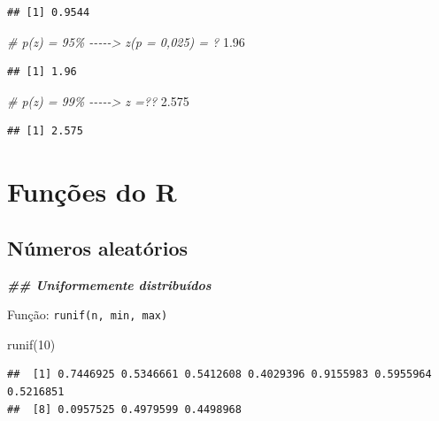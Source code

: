 \documentclass[
]{article}
\newenvironment{Shaded}{\begin{snugshade}}{\end{snugshade}}
\newcommand{\CommentTok}[1]{\textcolor[rgb]{0.56,0.35,0.01}{\textit{#1}}}
\newcommand{\DecValTok}[1]{\textcolor[rgb]{0.00,0.00,0.81}{#1}}
\newcommand{\DocumentationTok}[1]{\textcolor[rgb]{0.56,0.35,0.01}{\textbf{\textit{#1}}}}
\newcommand{\FloatTok}[1]{\textcolor[rgb]{0.00,0.00,0.81}{#1}}
\newcommand{\FunctionTok}[1]{\textcolor[rgb]{0.00,0.00,0.00}{#1}}
\newcommand{\NormalTok}[1]{#1}
\begin{document}
\begin{verbatim}
## [1] 0.9544
\end{verbatim}

\begin{Shaded}
\begin{Highlighting}[]
\CommentTok{\# p(z) = 95\% {-}{-}{-}{-}{-}\textgreater{} z(p = 0,025) = ?}
\FloatTok{1.96}
\end{Highlighting}
\end{Shaded}

\begin{verbatim}
## [1] 1.96
\end{verbatim}

\begin{Shaded}
\begin{Highlighting}[]
\CommentTok{\# p(z) = 99\% {-}{-}{-}{-}{-}\textgreater{} z =??}
\FloatTok{2.575}
\end{Highlighting}
\end{Shaded}

\begin{verbatim}
## [1] 2.575
\end{verbatim}

\hypertarget{funuxe7uxf5es-do-r}{%
\section{Funções do R}\label{funuxe7uxf5es-do-r}}

\hypertarget{nuxfameros-aleatuxf3rios}{%
\subsection{Números aleatórios}\label{nuxfameros-aleatuxf3rios}}

\begin{Shaded}
\begin{Highlighting}[]
\DocumentationTok{\#\# Uniformemente distribuídos}
\end{Highlighting}
\end{Shaded}

Função: \texttt{runif(n,\ min,\ max)}

\begin{Shaded}
\begin{Highlighting}[]
\FunctionTok{runif}\NormalTok{(}\DecValTok{10}\NormalTok{)}
\end{Highlighting}
\end{Shaded}

\begin{verbatim}
##  [1] 0.7446925 0.5346661 0.5412608 0.4029396 0.9155983 0.5955964 0.5216851
##  [8] 0.0957525 0.4979599 0.4498968
\end{verbatim}
\end{document}
